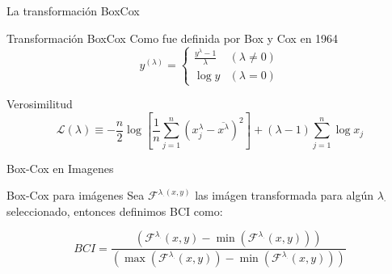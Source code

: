 \documentclass{beamer}
\begin{document}
\begin{frame}{La transformación BoxCox}
     
    \begin{block}{Transformación BoxCox}
    Como fue definida por Box y Cox en 1964 \cite{boxcox}
        \begin{equation}
            y^{(\lambda)}= \begin{cases}\frac{y^{\lambda}-1}{\lambda} & (\lambda \neq 0) \\ \log y & (\lambda=0)\end{cases}
        \end{equation}
    \end{block}
         
    \begin{block}{Verosimilitud}
        \begin{equation*}
            \mathcal{L}(\lambda) \equiv-\frac{n}{2} \log \left[\frac{1}{n} \sum_{j=1}^{n}\left(x_{j}^{\lambda}-\overline{x^{\lambda}}\right)^{2}\right] +(\lambda-1) \sum_{j=1}^{n} \log x_{j}
        \end{equation*}
    \end{block}
    
\end{frame}

\begin{frame}{Box-Cox en Imagenes}

    \begin{block}{Box-Cox para im\'agenes}
        Sea $\mathcal{F}^{\lambda_{\cdot}(x, y)}$ las im\'agen transformada para alg\'un $\lambda_\cdot$ seleccionado, entonces definimos BCI como:

    \begin{equation}
        BCI = \frac{\left(\mathcal{F}^{\lambda_{\cdot}}(x, y) - \min\left(\mathcal{F}^{\lambda_{\cdot}}(x, y)\right)\right)}{\left(\max\left(\mathcal{F}^{\lambda_{\cdot}}(x, y)\right) - \min\left(\mathcal{F}^{\lambda_{\cdot}}(x, y)\right)\right)}
    \end{equation}
        
        
    \end{block}
    
\end{frame}
\end{document}
